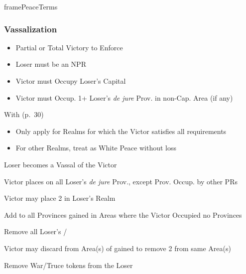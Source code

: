 \documentclass[10pt]{article}
\newlength{\fhPeaceTerms} \setlength\fhPeaceTerms{45.5\baselineskip}
\begin{document}
\begin{dynamiccontents*}{framePeaceTerms}
\begin{eubox}{\fhPeaceTerms}
\begin{multicols}{3}
		\subsubsection*{Vassalization }
		\begin{itemize}
			{
				\color{peaceReqColor}
				\item {}
				\begin{itemize}
					\item Partial or Total Victory to Enforce
					\item Loser must be an NPR
					\item Victor must Occupy Loser's Capital
					\item Victor must Occup. 1+ Loser's \emph{de jure} Prov. in non-Cap. Area (if any)
				\end{itemize}
			}
			\item With  (p.~30)
			\begin{itemize}
				\item Only apply for Realms for which the Victor satisfies all requirements
				\item For other Realms, treat as White Peace without \prestige loss
			\end{itemize}
			\item Loser becomes a Vassal of the Victor
			\item Victor places \vassalprovinces on all Loser's \emph{de jure} Prov., except Prov. Occup. by other PRs
			\item Victor may place 2 \influence in Loser's Realm
			\item Add \unrest to all Provinces gained in Areas where the Victor Occupied no Provinces
			\item Remove all Loser's \alliances/\marriages
			\item Victor may discard \claim from Area(s) of gained \vassalprovinces to remove 2 \unrest from same Area(s)
			\item Remove War/Truce tokens from the Loser
		\end{itemize}


\end{multicols}
\end{eubox}
\end{dynamiccontents*}
\end{document}
